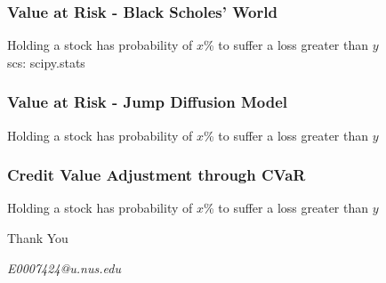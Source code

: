 \documentclass{beamer}
\begin{document}
\begin{frame}
\frametitle{Value at Risk - Black Scholes' World}
\begin{center}
Holding a stock has probability of $x$\% to suffer a loss greater than $y$\\[3mm]
scs: scipy.stats
\end{center}
\end{frame}

\begin{frame}
\frametitle{Value at Risk - Jump Diffusion Model}
\begin{center}
Holding a stock has probability of $x$\% to suffer a loss greater than $y$
\end{center}
\end{frame}

\begin{frame}
\frametitle{Credit Value Adjustment through CVaR}
\begin{center}
Holding a stock has probability of $x$\% to suffer a loss greater than $y$
\end{center}
\end{frame}

\begin{frame}
\Huge{\centerline{Thank You}}
\begin{center}
\begin{normalsize}
\emph{E0007424@u.nus.edu}
\end{normalsize}
\end{center}
\end{frame}


\end{document}

